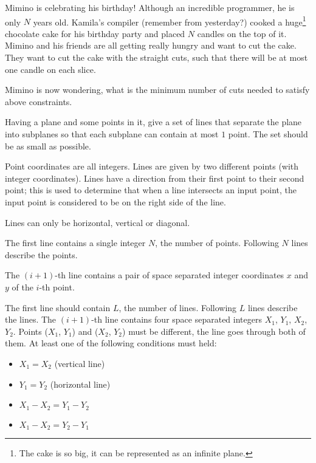 





Mimino is celebrating his birthday!
Although an incredible programmer, he is only $N$ years old.
Kamila's compiler (remember from yesterday?) cooked a huge\footnote{The cake is so big, it can be represented as an infinite plane.}
chocolate cake for his birthday party and placed $N$ candles on the top of it.
Mimino and his friends are all getting really hungry and want to cut the cake.
They want to cut the cake with the straight cuts, such that there will be at most one candle on each slice.

Mimino is now wondering, what is the minimum number of cuts needed to satisfy above constraints.


Having a plane and some points in it, give a set of lines that separate the plane into subplanes so that each subplane can contain at most $1$ point. The set should be as small as possible.

Point coordinates are all integers. Lines are given by two different points (with integer coordinates). Lines have a direction from their first point to their second point; this is used to determine that when a line intersects an input point, the input point is considered to be on the right side of the line.

Lines can only be horizontal, vertical or diagonal.


The first line contains a single integer $N$, the number of points.
Following $N$ lines describe the points.

The $(i+1)$-th line contains a pair of space separated integer coordinates $x$ and $y$ of the $i$-th point.


The first line should contain $L$, the number of lines.
Following $L$ lines describe the lines.
The $(i+1)$-th line contains four space separated integers $X_1$, $Y_1$, $X_2$, $Y_2$. Points ($X_1$, $Y_1$) and ($X_2$, $Y_2$) must be different, the line goes through both of them. At least one of the following conditions must held:

\begin{itemize}
  \item $X_1 = X_2$ (vertical line)
  \item $Y_1 = Y_2$ (horizontal line)
  \item $X_1 - X_2 = Y_1 - Y_2$
  \item $X_1 - X_2 = Y_2 - Y_1$
\end{itemize}

